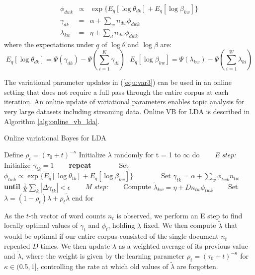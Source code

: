 \begin{eqnarray}\label{equ:var3}
    \phi_{dwk} &\propto& \exp \{E_q[\log \theta_{dk}]+E_q[\log \beta_{kw}]\}\\
    \gamma_{dk} &=& \alpha + \sum_w n_{dw}\phi_{dwk} \\
    \lambda_{kw} &=& \eta + \sum_d n_{dw}\phi_{dwk}
\end{eqnarray}
where the expectations under $q$ of $\log \theta$ and $\log \beta$ are:
\begin{equation}
    E_q[\log \theta_{dk}] = \Psi(\gamma_{dk}) - \Psi(\sum_{i=1}^{K}\gamma_{di}) ~~~ E_q[\log \beta_{kw}] = \Psi(\lambda_{kw})-\Psi(\sum_{i=1}^{W}\lambda_{ki})
\end{equation}

The variational parameter updates in (\ref{equ:var3}) can be used in an online setting that does not require a full pass through the entire corpus at each iteration. An online update of variational parameters enables topic analysis for very large datasets including streaming data. Online VB for LDA is described in Algorithm \ref{alg:online_vb_lda}.\\

\begin{algorithm}
\caption{Online variational Bayes for LDA \cite{Hoffman2010}}
\label{alg:online_vb_lda}
\begin{algorithmic}[1]
\STATE Define $\rho_t = (\tau_0 + t)^{-\kappa}$
\STATE Initialize $\lambda$ randomly
\STATE for t = 1 to $\infty$ do 
\STATE ~~~ \textit{E step:} 
\STATE ~~~ Initialize $\gamma_{tk} = 1$ 
\STATE ~~~ \textbf{repeat} 
\STATE ~~~ ~~~ Set $\phi_{twk} \propto \exp \{E_q[\log \theta_{tk}]+E_q[\log \beta_{kw}]\}$ 
\STATE ~~~ ~~~ Set $\gamma_{tk} = \alpha + \sum_{w}\phi_{twk}n_{tw}$
\STATE ~~~ \textbf{until} $\frac{1}{K}\sum_k|\Delta \gamma_{tk}| < \epsilon$
\STATE ~~~ \textit{M step:} 
\STATE ~~~ Compute $\tilde{\lambda}_{kw} = \eta + Dn_{tw}\phi_{twk}$ 
\STATE ~~~ Set $\lambda = (1-\rho_t)\lambda + \rho_t \tilde{\lambda}$ 
\STATE end for
\end{algorithmic}
\end{algorithm}

As the $t$-th vector of word counts $n_t$ is observed, we perform an E step to find locally optimal values of $\gamma_t$ and $\phi_t$, holding $\lambda$ fixed. We then compute $\tilde{\lambda}$ that would be optimal if our entire corpus consisted of the single document $n_t$ repeated $D$ times. We then update $\lambda$ as a weighted average of its previous value and $\tilde{\lambda}$, where the weight is given by the learning parameter $\rho_t = (\tau_0 + t)^{-\kappa}$ for $\kappa \in (0.5,1]$, controlling the rate at which old values of $\tilde{\lambda}$ are forgotten.\\

